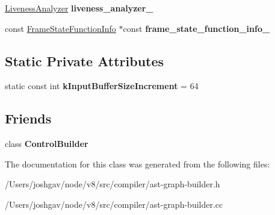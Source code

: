 \begin{DoxyCompactItemize}
\item 
\hyperlink{classv8_1_1internal_1_1compiler_1_1_liveness_analyzer}{Liveness\+Analyzer} {\bfseries liveness\+\_\+analyzer\+\_\+}\hypertarget{classv8_1_1internal_1_1compiler_1_1_ast_graph_builder_a20b4e4f481d06ce22d586405319e5253}{}\label{classv8_1_1internal_1_1compiler_1_1_ast_graph_builder_a20b4e4f481d06ce22d586405319e5253}

\item 
const \hyperlink{classv8_1_1internal_1_1compiler_1_1_frame_state_function_info}{Frame\+State\+Function\+Info} $\ast$const {\bfseries frame\+\_\+state\+\_\+function\+\_\+info\+\_\+}\hypertarget{classv8_1_1internal_1_1compiler_1_1_ast_graph_builder_aefe2acd9847ccf00f11a9cae60e79383}{}\label{classv8_1_1internal_1_1compiler_1_1_ast_graph_builder_aefe2acd9847ccf00f11a9cae60e79383}

\end{DoxyCompactItemize}
\subsection*{Static Private Attributes}
\begin{DoxyCompactItemize}
\item 
static const int {\bfseries k\+Input\+Buffer\+Size\+Increment} = 64\hypertarget{classv8_1_1internal_1_1compiler_1_1_ast_graph_builder_a01ab146df2539db4a0fcbae76a96cd14}{}\label{classv8_1_1internal_1_1compiler_1_1_ast_graph_builder_a01ab146df2539db4a0fcbae76a96cd14}

\end{DoxyCompactItemize}
\subsection*{Friends}
\begin{DoxyCompactItemize}
\item 
class {\bfseries Control\+Builder}\hypertarget{classv8_1_1internal_1_1compiler_1_1_ast_graph_builder_aff1860cbfcc831151e22f9dc2c848f34}{}\label{classv8_1_1internal_1_1compiler_1_1_ast_graph_builder_aff1860cbfcc831151e22f9dc2c848f34}

\end{DoxyCompactItemize}


The documentation for this class was generated from the following files\+:\begin{DoxyCompactItemize}
\item 
/\+Users/joshgav/node/v8/src/compiler/ast-\/graph-\/builder.\+h\item 
/\+Users/joshgav/node/v8/src/compiler/ast-\/graph-\/builder.\+cc\end{DoxyCompactItemize}
